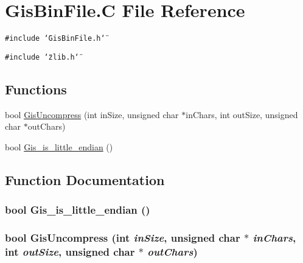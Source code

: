 \hypertarget{GisBinFile_8C}{
\section{Gis\-Bin\-File.C File Reference}
\label{GisBinFile_8C}
}
{\tt \#include \char`\"{}Gis\-Bin\-File.h\char`\"{}}\par
{\tt \#include \char`\"{}zlib.h\char`\"{}}\par
\subsection*{Functions}
\begin{CompactItemize}
\item 
bool \hyperlink{GisBinFile_8C_a0}{Gis\-Uncompress} (int in\-Size, unsigned char $\ast$in\-Chars, int out\-Size, unsigned char $\ast$out\-Chars)
\item 
bool \hyperlink{GisBinFile_8C_a1}{Gis\_\-is\_\-little\_\-endian} ()
\end{CompactItemize}


\subsection{Function Documentation}
\hypertarget{GisBinFile_8C_a1}{
\subsubsection[Gis\_\-is\_\-little\_\-endian]{\setlength{\rightskip}{0pt plus 5cm}bool Gis\_\-is\_\-little\_\-endian ()}}
\label{GisBinFile_8C_a1}


\hypertarget{GisBinFile_8C_a0}{
\subsubsection[GisUncompress]{\setlength{\rightskip}{0pt plus 5cm}bool Gis\-Uncompress (int {\em in\-Size}, unsigned char $\ast$ {\em in\-Chars}, int {\em out\-Size}, unsigned char $\ast$ {\em out\-Chars})}}
\label{GisBinFile_8C_a0}


